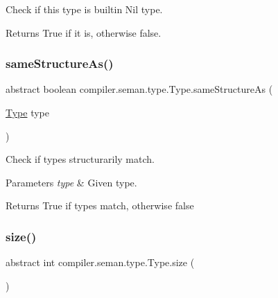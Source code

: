 Check if this type is builtin Nil type. \begin{DoxyReturn}{Returns}
True if it is, otherwise false. 
\end{DoxyReturn}
\mbox{\label{classcompiler_1_1seman_1_1type_1_1_type_a80ff5c751157b91a4ef7a72d072608e5}} 
\subsubsection{\texorpdfstring{same\+Structure\+As()}{sameStructureAs()}}
{\footnotesize\ttfamily abstract boolean compiler.\+seman.\+type.\+Type.\+same\+Structure\+As (\begin{DoxyParamCaption}\item[{\hyperlink{classcompiler_1_1seman_1_1type_1_1_type}{Type}}]{type }\end{DoxyParamCaption})\hspace{0.3cm}{\ttfamily [abstract]}}

Check if types structurarily match.


\begin{DoxyParams}{Parameters}
{\em type} & Given type. \\
\hline
\end{DoxyParams}
\begin{DoxyReturn}{Returns}
True if types match, otherwise false 
\end{DoxyReturn}
\mbox{\label{classcompiler_1_1seman_1_1type_1_1_type_a9068b6449da6f7d0423a9d0f063d73f1}} 
\subsubsection{\texorpdfstring{size()}{size()}}
{\footnotesize\ttfamily abstract int compiler.\+seman.\+type.\+Type.\+size (\begin{DoxyParamCaption}{ }\end{DoxyParamCaption})\hspace{0.3cm}{\ttfamily [abstract]}}

